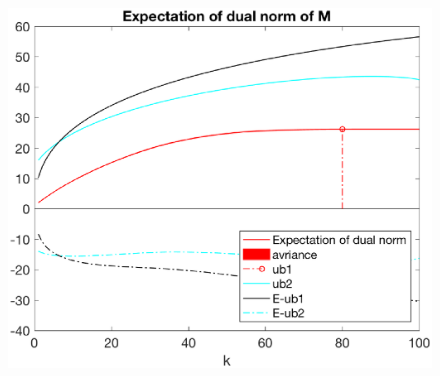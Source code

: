 \documentclass[12pt]{article}
\begin{document}
\begin{figure}[h]
    \begin{minipage}[c]{.4\linewidth}
        \centering
        \includegraphics[width=\linewidth]{Fig/dualnorm-u0rand-k0-80-minusnoise.eps}
    \end{minipage}
\end{figure}
\end{document}
